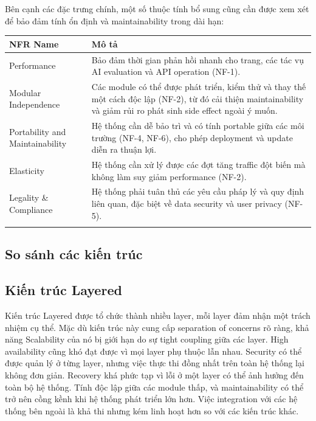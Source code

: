 Bên cạnh các đặc trưng chính, một số thuộc tính bổ sung cũng cần được xem xét để bảo đảm tính ổn định và maintainability trong dài hạn:


{\scriptsize
\setlength{\tabcolsep}{4pt}
\renewcommand{\arraystretch}{1.5}
\begin{tabularx}{\textwidth}{|>{\centering\arraybackslash}m{4cm}|>{\arraybackslash}X|}
\hline
\textbf{NFR Name} & \textbf{Mô tả} \\ \hline
Performance & Bảo đảm thời gian phản hồi nhanh cho trang, các tác vụ AI evaluation và API operation (NF-1). \\ \hline
Modular Independence & Các module có thể được phát triển, kiểm thử và thay thế một cách độc lập (NF-2), từ đó cải thiện maintainability và giảm rủi ro phát sinh side effect ngoài ý muốn. \\ \hline
Portability and Maintainability & Hệ thống cần dễ bảo trì và có tính portable giữa các môi trường (NF-4, NF-6), cho phép deployment và update diễn ra thuận lợi. \\ \hline
Elasticity & Hệ thống cần xử lý được các đợt tăng traffic đột biến mà không làm suy giảm performance (NF-2). \\ \hline
Legality \& Compliance & Hệ thống phải tuân thủ các yêu cầu pháp lý và quy định liên quan, đặc biệt về data security và user privacy (NF-5). \\ \hline
\caption{Các đặc trưng hàm ẩn cho tính ổn định dài hạn}
\end{tabularx}}


\subsection{So sánh các kiến trúc}
\subsection{Kiến trúc Layered}
Kiến trúc Layered được tổ chức thành nhiều layer, mỗi layer đảm nhận một trách nhiệm cụ thể. Mặc dù kiến trúc này cung cấp separation of concerns rõ ràng, khả năng Scalability của nó bị giới hạn do sự tight coupling giữa các layer. High availability cũng khó đạt được vì mọi layer phụ thuộc lẫn nhau. Security có thể được quản lý ở từng layer, nhưng việc thực thi đồng nhất trên toàn hệ thống lại không đơn giản. Recovery khá phức tạp vì lỗi ở một layer có thể ảnh hưởng đến toàn bộ hệ thống. Tính độc lập giữa các module thấp, và maintainability có thể trở nên cồng kềnh khi hệ thống phát triển lớn hơn. Việc integration với các hệ thống bên ngoài là khả thi nhưng kém linh hoạt hơn so với các kiến trúc khác.

